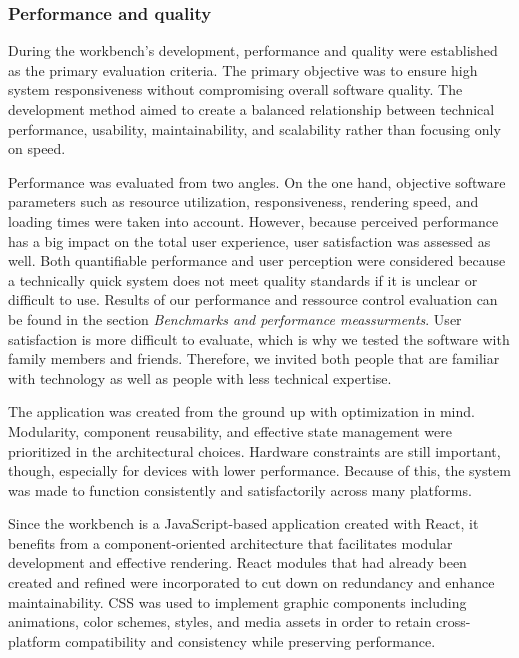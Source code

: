 \documentclass[a4paper,12pt]{article}
\begin{document}
\newpage
\subsubsection{Performance and quality}
During the workbench's development, performance and quality were established as the primary evaluation criteria. The primary objective was to ensure high system responsiveness without compromising overall software quality. The development method aimed to create a balanced relationship between technical performance, usability, maintainability, and scalability rather than focusing only on speed.

Performance was evaluated from two angles. On the one hand, objective software parameters such as resource utilization, responsiveness, rendering speed, and loading times were taken into account. However, because perceived performance has a big impact on the total user experience, user satisfaction was assessed as well. Both quantifiable performance and user perception were considered because a technically quick system does not meet quality standards if it is unclear or difficult to use. Results of our performance and ressource control evaluation can be found in the section \textit{Benchmarks and performance meassurments}. 
User satisfaction is more difficult to evaluate, which is why we tested the software with family members and friends. Therefore, we invited both people that are familiar with technology as well as people with less technical expertise. 

The application was created from the ground up with optimization in mind. Modularity, component reusability, and effective state management were prioritized in the architectural choices. Hardware constraints are still important, though, especially for devices with lower performance. Because of this, the system was made to function consistently and satisfactorily across many platforms.

Since the workbench is a JavaScript-based application created with React, it benefits from a component-oriented architecture that facilitates modular development and effective rendering. React modules that had already been created and refined were incorporated to cut down on redundancy and enhance maintainability. CSS was used to implement graphic components including animations, color schemes, styles, and media assets in order to retain cross-platform compatibility and consistency while preserving performance.
\end{document}
